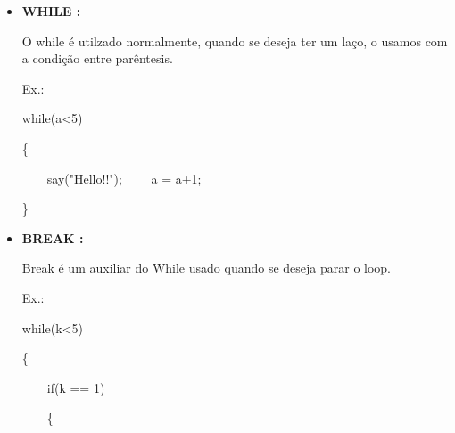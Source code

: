 \documentclass[a4paper]{article}
\begin{document}
{{{{{{{{\begin{itemize}
            \textcolor{NavyBlue}{Ex.:}
            
            \textcolor{NavyBlue}{if(a>b)}
            
            \{
            
            \ \ \ \  say("a é maior");
            
            \}
            
            \textcolor{NavyBlue}{elsif(a == b)}
            
            \{
            
            \ \ \ \ say("a é igual a b");
            
            \}
            
            \textcolor{NavyBlue}{else}
            
            \{
            
            \ \ \ \  say("a é menor a b");
            
            \}
    
        \bigskip    
            
        \item \textbf{WHILE :}
            
            O while é utilzado normalmente, quando se
            deseja ter um laço, o usamos com a condição
            entre parêntesis.
        
            \textcolor{NavyBlue}{Ex.:}
            
            \textcolor{NavyBlue}{while(a<5)}
            
            \{
            
            \ \ \ \  say("Hello!!");
            \ \ \ \  a = a+1;
            
            \}
        
        \bigskip
            
        \item \textbf{BREAK :}
            
            Break é um auxiliar do While usado quando se 
            deseja parar o loop.
            
            \textcolor{NavyBlue}{Ex.:}
            
            while(k<5)
            
            \{
            
            \ \ \ \ if(k == 1)
              
            \ \ \ \ \{
              

\end{itemize}}}}}}}}}
\end{document}
